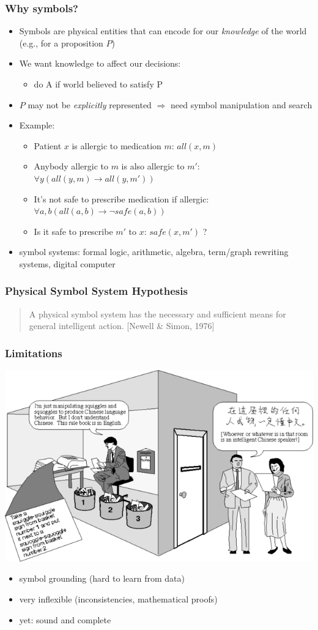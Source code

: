 \documentclass{beamer}
\begin{document}
\begin{frame}
\frametitle{Why symbols?}
\begin{itemize}
\item Symbols are physical entities that can encode for our {\em
    knowledge} of the world (e.g., for a proposition $P$)
\item We want knowledge to affect our decisions:
  \begin{itemize}
  \item do A if world believed to satisfy P
  \end{itemize}
\item $P$ may not be {\em explicitly} represented $\Rightarrow$ need
  symbol manipulation and search
\item Example:
  \begin{itemize}
  \item Patient $x$ is allergic to medication $m$: $all(x,m)$
  \item Anybody allergic to $m$ is also allergic to $m'$: $\forall
    y(all(y,m) \rightarrow all(y,m'))$
  \item It's not safe to prescribe medication if allergic: $\forall a,
    b (all(a,b) \rightarrow \neg safe(a,b))$
  \item Is it safe to prescribe $m'$ to $x$: $safe(x, m')$ ?
  \end{itemize}
\item symbol systems: formal logic, arithmetic, algebra, term/graph
  rewriting systems, digital computer
\end{itemize}
\end{frame}

\begin{frame}
  \frametitle{Physical Symbol System Hypothesis}
  \begin{quote}
    A physical symbol system has
    the necessary and sufficient means for general intelligent
    action. [Newell \& Simon, 1976]
  \end{quote}
\end{frame}

\begin{frame}
  \frametitle{Limitations}
  \centerline{\includegraphics[width=.75\textwidth]{chinese-room.png}}  
  \begin{itemize}
  \item symbol grounding (hard to learn from data)
  \item very inflexible (inconsistencies, mathematical proofs)
  \item yet: sound and complete
  \end{itemize}
\end{frame}
\end{document}
